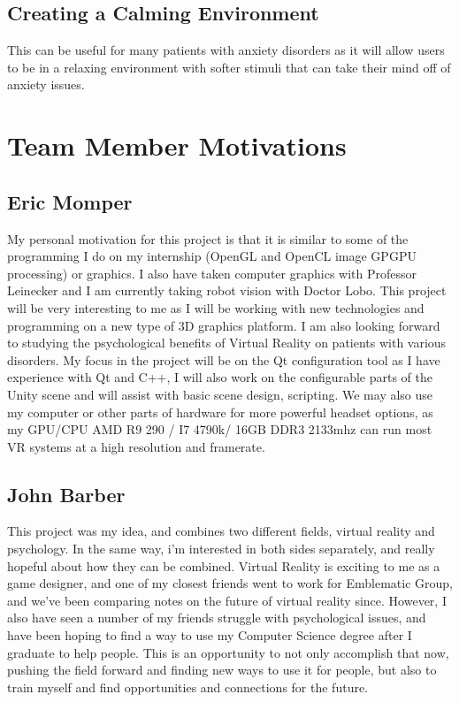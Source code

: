 \documentclass[a4paper,10pt,twoside]{article}
\begin{document}
	\subsection{Creating a Calming Environment}
	This can be useful for many patients with anxiety disorders as it will allow users to be in a relaxing environment with softer stimuli that can take their mind off of anxiety issues. 
	\pagebreak
	
	
	\section{Team Member Motivations}
	\subsection{Eric Momper}
	My personal motivation for this project is that it is similar to some of the programming I do on my internship (OpenGL and OpenCL image GPGPU processing) or graphics.
	I also have taken computer graphics with Professor Leinecker and I am currently taking robot vision with Doctor Lobo. This project will be very interesting to me as  
	I will be working with new technologies and programming on a new type of 3D graphics platform. I am also looking forward to studying the psychological benefits
	of Virtual Reality on patients with various disorders. My focus in the project will be on the Qt configuration tool as I have experience with Qt and C++, I will 
	also work on the configurable parts of the Unity scene and will assist with basic scene design, scripting. We may also use my computer or other parts of hardware for more powerful headset options, 
	as my GPU/CPU AMD R9 290 / I7 4790k/ 16GB DDR3 2133mhz can run most VR systems at a high resolution and framerate. 
	
	\subsection{John Barber}
	This project was my idea, and combines two different fields, virtual reality and psychology.  In the same way, i'm interested in both 
	sides separately, and really hopeful about how they can be combined.  Virtual Reality is exciting to me as a game designer, 
	and one of my closest friends went to work for Emblematic Group, and we've been comparing notes on the future of virtual reality since.  
	However, I also have seen a number of my friends struggle with psychological issues, and have been hoping to find a way to use my Computer 
	Science degree after I graduate to help people.  This is an opportunity to not only accomplish that now, pushing the field forward and finding 
	new ways to use it for people, but also to train myself and find opportunities and connections for the future.
\end{document}
